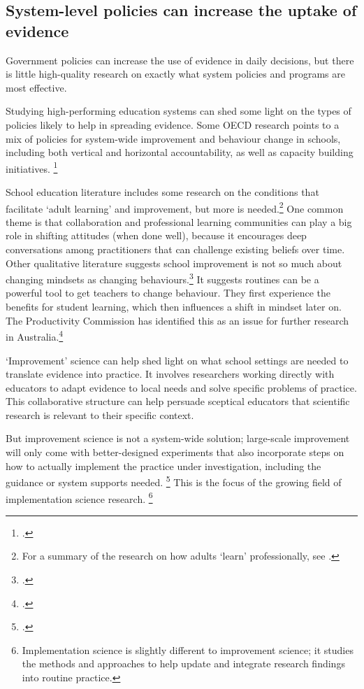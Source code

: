 \subsection{System-level policies can increase the uptake of evidence}\label{subsec:System-level-policies-can-increase-the-uptake-of-evidence}

Government policies can increase the use of evidence in daily decisions, but there is little high-quality research on exactly what system policies and programs are most effective. 

Studying high-performing education systems can shed some light on the types of policies likely to help in spreading evidence. Some OECD research points to a mix of policies for system-wide improvement and behaviour change in schools, including both vertical and horizontal accountability, as well as capacity building initiatives.%
\footcite{BurnsKoster2016GoverningEducation}

School education literature includes some research on the conditions that facilitate `adult learning' and improvement, but more is needed.\footnote{For a summary of the research on how adults `learn' professionally, see \textcite{Jensen2016PDTeacherProfessional}.}
One common theme is that collaboration and professional learning communities can play a big role in shifting attitudes (when done well), because it encourages deep conversations among practitioners that can challenge existing beliefs over time. Other qualitative literature suggests school improvement is not so much about changing mindsets as changing behaviours.\footcite{Macklin2017DrivingSchoolImprovement}
It suggests routines can be a powerful tool to get teachers to change behaviour. They first experience the benefits for student learning, which then influences a shift in mindset later on. The Productivity Commission has identified this as an issue for further research in Australia.\footcite{ProductivityCommission2016NationalEvidenceBase}

`Improvement' science can help shed light on what school settings are needed to translate evidence into practice. It involves researchers working directly with educators to adapt evidence to local needs and solve specific problems of practice. This collaborative structure can help persuade sceptical educators that scientific research is relevant to their specific context.

But improvement science is not a system-wide solution; large-scale improvement will only come with better-designed experiments that also incorporate steps on how to actually implement the practice under investigation, including the guidance or system supports needed.%
  \footcite{Dynarski2015UsingresearchtoimproveeducationundertheEveryStudentSucceedsAct}
This is the focus of the growing field of implementation science research.%
  \footnote{Implementation science is slightly different to improvement science; it studies the methods and approaches to help update and integrate research findings into routine practice.}

